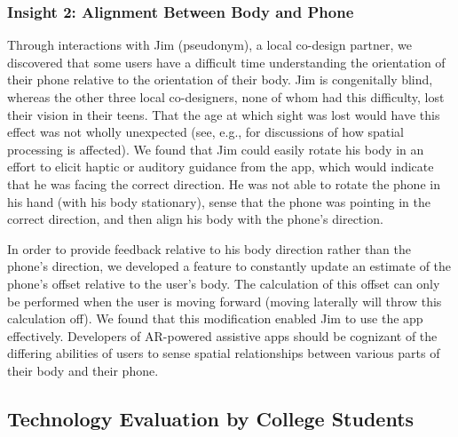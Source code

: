 \documentclass[chi_draft]{sigchi}
\begin{document}
\subsubsection{Insight 2: Alignment Between Body and Phone}
Through interactions with Jim (pseudonym), a local co-design partner, we discovered that some users have a difficult time understanding the orientation of their phone relative to the orientation of their body.  Jim is congenitally blind, whereas the other three local co-designers, none of whom had this difficulty, lost their vision in their teens.  That the age at which sight was lost would have this effect was not wholly unexpected (see, e.g., \cite{long1997establishing, wiener2010foundations, schinazi2016spatial, thinus1997representation, williams2014just} for discussions of how spatial processing is affected).  We found that Jim could easily rotate his body in an effort to elicit haptic or auditory guidance from the app, which would indicate that he was facing the correct direction.  He was not able to rotate the phone in his hand (with his body stationary), sense that the phone was pointing in the correct direction, and then align his body with the phone's direction.

In order to provide feedback relative to his body direction rather than the phone's direction, we developed a feature to constantly update an estimate of the phone's offset relative to the user's body.  The calculation of this offset can only be performed when the user is moving forward (moving laterally will throw this calculation off).  We found that this modification enabled Jim to use the app effectively.  Developers of AR-powered assistive apps should be cognizant of the differing abilities of users to sense spatial relationships between various parts of their body and their phone.

\subsection{Technology Evaluation by College Students}
\end{document}
